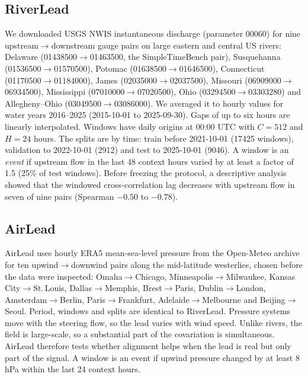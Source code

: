 \documentclass[preprint,11pt,authoryear]{elsarticle}
\begin{document}
\subsection{RiverLead}
We downloaded USGS NWIS instantaneous discharge (parameter 00060) for nine upstream$\to$downstream gauge pairs on large eastern and central US rivers: Delaware (01438500$\to$01463500, the SimpleTimeBench pair), Susquehanna (01536500$\to$01570500), Potomac (01638500$\to$01646500), Connecticut (01170500$\to$01184000), James (02035000$\to$02037500), Missouri (06909000$\to$06934500), Mississippi (07010000$\to$07020500), Ohio (03294500$\to$03303280) and Allegheny--Ohio (03049500$\to$03086000). We averaged it to hourly values for water years 2016--2025 (2015-10-01 to 2025-09-30). Gaps of up to six hours are linearly interpolated. Windows have daily origins at 00:00 UTC with $C=512$ and $H=24$ hours. The splits are by time: train before 2021-10-01 (\num{17425} windows), validation to 2022-10-01 (\num{2912}) and test to 2025-10-01 (\num{9046}). A window is an \emph{event} if upstream flow in the last 48 context hours varied by at least a factor of 1.5 (25\% of test windows). Before freezing the protocol, a descriptive analysis showed that the windowed cross-correlation lag decreases with upstream flow in seven of nine pairs (Spearman $-0.50$ to $-0.78$).

\subsection{AirLead}
AirLead uses hourly ERA5 mean-sea-level pressure from the Open-Meteo archive for ten upwind$\to$downwind pairs along the mid-latitude westerlies, chosen before the data were inspected: Omaha$\to$Chicago, Minneapolis$\to$Milwaukee, Kansas City$\to$St.\,Louis, Dallas$\to$Memphis, Brest$\to$Paris, Dublin$\to$London, Amsterdam$\to$Berlin, Paris$\to$Frankfurt, Adelaide$\to$Melbourne and Beijing$\to$Seoul. Period, windows and splits are identical to RiverLead. Pressure systems move with the steering flow, so the lead varies with wind speed. Unlike rivers, the field is large-scale, so a substantial part of the covariation is simultaneous. AirLead therefore tests whether alignment helps when the lead is real but only part of the signal. A window is an event if upwind pressure changed by at least 8\,hPa within the last 24 context hours.
\end{document}
